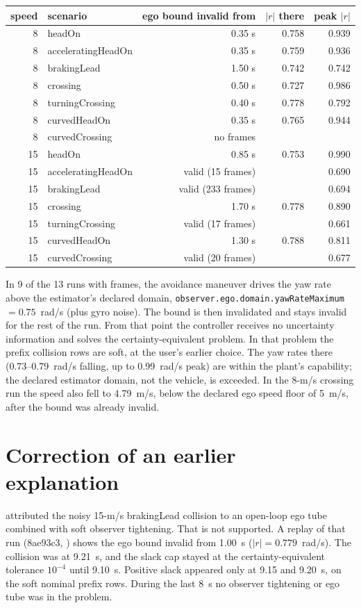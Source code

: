 \documentclass[11pt]{article}
\begin{document}
\begin{center}
\begin{tabular}{rlrrr}
\toprule
speed & scenario & ego bound invalid from & $|r|$ there & peak $|r|$\\
\midrule
8 & headOn & 0.35 s & 0.758 & 0.939\\
8 & acceleratingHeadOn & 0.35 s & 0.759 & 0.936\\
8 & brakingLead & 1.50 s & 0.742 & 0.742\\
8 & crossing & 0.50 s & 0.727 & 0.986\\
8 & turningCrossing & 0.40 s & 0.778 & 0.792\\
8 & curvedHeadOn & 0.35 s & 0.765 & 0.944\\
8 & curvedCrossing & no frames & & \\
15 & headOn & 0.85 s & 0.753 & 0.990\\
15 & acceleratingHeadOn & valid (15 frames) & & 0.690\\
15 & brakingLead & valid (233 frames) & & 0.694\\
15 & crossing & 1.70 s & 0.778 & 0.890\\
15 & turningCrossing & valid (17 frames) & & 0.661\\
15 & curvedHeadOn & 1.30 s & 0.788 & 0.811\\
15 & curvedCrossing & valid (20 frames) & & 0.677\\
\bottomrule
\end{tabular}
\end{center}
In 9 of the 13 runs with frames, the avoidance maneuver drives the yaw rate
above the estimator's declared domain,
\texttt{observer.ego.domain.yawRateMaximum} $=0.75$~rad/s (plus gyro noise).
The bound is then invalidated and stays invalid for the rest of the run. From
that point the controller receives no uncertainty information and solves the
certainty-equivalent problem. In that problem the prefix collision rows are
soft, at the user's earlier choice. The yaw rates there (0.73--0.79~rad/s
falling, up to 0.99~rad/s peak) are within the plant's capability; the declared
estimator domain, not the vehicle, is exceeded. In the 8-m/s crossing run the
speed also fell to 4.79~m/s, below the declared ego speed floor of 5~m/s,
after the bound was already invalid.

\section{Correction of an earlier explanation}
 attributed the noisy 15-m/s brakingLead
collision to an open-loop ego tube combined with soft observer tightening.
That is not supported. A replay of that run (8ae93c3,
) shows the ego bound invalid from 1.00~s
($|r|=0.779$~rad/s). The collision was at 9.21~s, and the slack cap stayed at
the certainty-equivalent tolerance $10^{-4}$ until 9.10~s. Positive slack
appeared only at 9.15 and 9.20~s, on the soft nominal prefix rows. During
the last 8~s no observer tightening or ego tube was in the problem.
\end{document}
